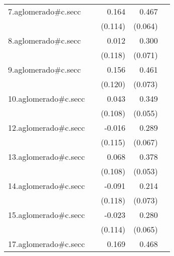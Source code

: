 {\begin{longtable}{l*{4}{D{.}{.}{-1}}}
\addlinespace
7.aglomerado#c.secc&                     &       0.164         &       0.467\sym{***}&                     \\
            &                     &     (0.114)         &     (0.064)         &                     \\
\addlinespace
8.aglomerado#c.secc&                     &       0.012         &       0.300\sym{***}&                     \\
            &                     &     (0.118)         &     (0.071)         &                     \\
\addlinespace
9.aglomerado#c.secc&                     &       0.156         &       0.461\sym{***}&                     \\
            &                     &     (0.120)         &     (0.073)         &                     \\
\addlinespace
10.aglomerado#c.secc&                     &       0.043         &       0.349\sym{***}&                     \\
            &                     &     (0.108)         &     (0.055)         &                     \\
\addlinespace
12.aglomerado#c.secc&                     &      -0.016         &       0.289\sym{***}&                     \\
            &                     &     (0.115)         &     (0.067)         &                     \\
\addlinespace
13.aglomerado#c.secc&                     &       0.068         &       0.378\sym{***}&                     \\
            &                     &     (0.108)         &     (0.053)         &                     \\
\addlinespace
14.aglomerado#c.secc&                     &      -0.091         &       0.214\sym{**} &                     \\
            &                     &     (0.118)         &     (0.073)         &                     \\
\addlinespace
15.aglomerado#c.secc&                     &      -0.023         &       0.280\sym{***}&                     \\
            &                     &     (0.114)         &     (0.065)         &                     \\
\addlinespace
17.aglomerado#c.secc&                     &       0.169         &       0.468\sym{***}&                     \\

\end{longtable}}
